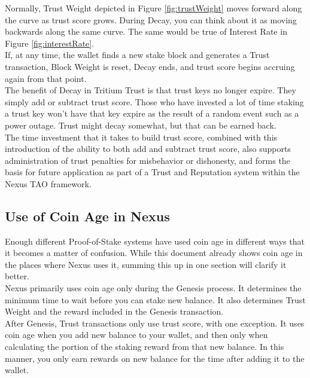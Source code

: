 \documentclass[11pt]{article}
\begin{document}
\noindent Normally, Trust Weight depicted in Figure \ref{fig:trustWeight} moves forward along the curve as trust score grows. During Decay, you can think about it as moving backwards along the same curve. The same would be true of Interest Rate in Figure \ref{fig:interestRate}. \\

\noindent If, at any time, the wallet finds a new stake block and generates a Trust transaction, Block Weight is reset, Decay ends, and trust score begins accruing again from that point. \\

\noindent The benefit of Decay in Tritium Trust is that trust keys no longer expire. They simply add or subtract trust score. Those who have invested a lot of time staking a trust key won’t have that key expire as the result of a random event such as a power outage. Trust might decay somewhat, but that can be earned back.\\

\noindent The time investment that it takes to build trust score, combined with this introduction of the ability to both add and subtract trust score, also supports administration of trust penalties for misbehavior or dishonesty, and forms the basis for future application as part of a Trust and Reputation system within the Nexus TAO framework.\\

\subsection{Use of Coin Age in Nexus}
Enough different Proof-of-Stake systems have used coin age in different ways that it becomes a matter of confusion. While this document already shows coin age in the places where Nexus uses it, summing this up in one section will clarify it better.\\

\noindent Nexus primarily uses coin age only during the Genesis process. It determines the minimum time to wait before you can stake new balance. It also determines Trust Weight and the  reward included in the Genesis transaction.\\

\noindent After Genesis, Trust transactions only use trust score, with one exception. It uses coin age when you add new balance to your wallet, and then only when calculating the portion of the staking reward from that new balance. In this manner, you only earn rewards on new balance for the time after adding it to the wallet.\\
\end{document}
